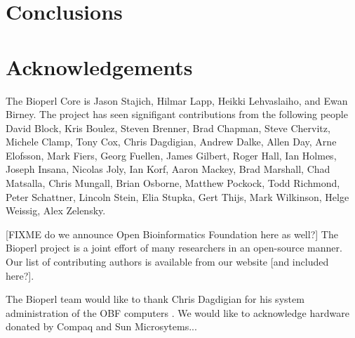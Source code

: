 \documentclass{article}
\begin{document}
\begin{twocolumn}


\section{Conclusions}

\section{Acknowledgements}

The Bioperl Core is Jason Stajich, Hilmar Lapp, Heikki Lehvaslaiho,
and Ewan Birney.  The project has seen signifigant contributions from
the following people David Block, Kris Boulez, Steven Brenner, Brad
Chapman, Steve Chervitz, Michele Clamp, Tony Cox, Chris Dagdigian,
Andrew Dalke, Allen Day, Arne Elofsson, Mark Fiers, Georg Fuellen,
James Gilbert, Roger Hall, Ian Holmes, Joseph Insana, Nicolas Joly,
Ian Korf, Aaron Mackey, Brad Marshall, Chad Matsalla, Chris Mungall,
Brian Osborne, Matthew Pockock, Todd Richmond, Peter Schattner,
Lincoln Stein, Elia Stupka, Gert Thijs, Mark Wilkinson, Helge Weissig,
Alex Zelensky.

 
[FIXME do we announce Open Bioinformatics Foundation here as well?]
The Bioperl project is a joint effort of many researchers in an
open-source manner.  Our list of contributing authors is available
from our website [and included here?]. 

The Bioperl team would like to thank Chris Dagdigian for his system
administration of the OBF computers .  We would like to acknowledge
hardware donated by Compaq and Sun Microsytems...


 

\end{twocolumn}
\end{document}
